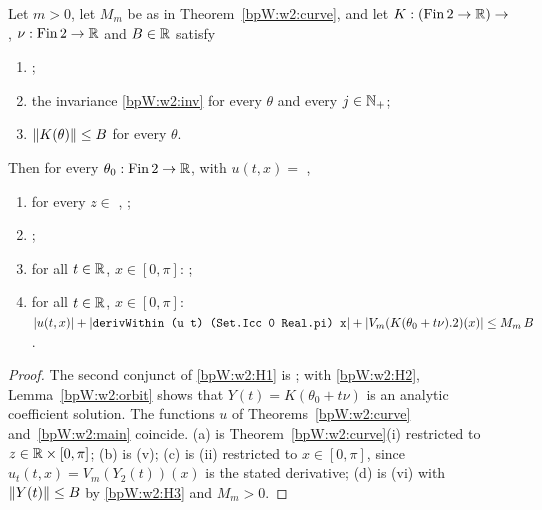 \begin{theorem}\label{bpW:w2:main}
Let $m>0$, let $M_m$ be as in Theorem~\ref{bpW:w2:curve}, and let $K:(\mathrm{Fin}\,2\to\mathbb{R})\to$ ,
$\nu:\mathrm{Fin}\,2\to\mathbb{R}$ and $B\in\mathbb{R}$ satisfy
\begin{enumerate}[label=(H\arabic*)]
\item\label{bpW:w2:H1} ;
\item\label{bpW:w2:H2} the invariance \eqref{bpW:w2:inv} for every $\theta$ and every $j\in\mathbb{N}_+$;
\item\label{bpW:w2:H3} $\lVert K(\theta)\rVert\le B$ for every $\theta$.
\end{enumerate}
Then for every $\theta_0:\mathrm{Fin}\,2\to\mathbb{R}$, with $u(t,x)=$ ,
\begin{enumerate}[label=(\alph*)]
\item for every $z\in$ ,
  ;
\item {};
\item for all $t\in\mathbb{R}$, $x\in[0,\pi]$: ;
\item for all $t\in\mathbb{R}$, $x\in[0,\pi]$:
  $\lvert u(t,x)\rvert+\lvert \texttt{derivWithin (u t) (Set.Icc 0 Real.pi) x}\rvert+\lvert V_m(K(\theta_0+t\nu).2)(x)\rvert\le M_m\,B$.
\end{enumerate}
\end{theorem}

\begin{proof}
\label{stepW:w2:mred}
The second conjunct of \ref{bpW:w2:H1} is ; with \ref{bpW:w2:H2},
Lemma~\ref{bpW:w2:orbit} shows that $Y(t)=K(\theta_0+t\nu)$ is an analytic coefficient solution. The functions $u$ of
Theorems~\ref{bpW:w2:curve} and~\ref{bpW:w2:main} coincide.
\label{stepW:w2:mconc}
(a) is Theorem~\ref{bpW:w2:curve}(i) restricted to $z\in\mathbb{R}\times[0,\pi]$; (b) is (v); (c) is (ii) restricted to
$x\in[0,\pi]$, since $u_t(t,x)=V_m(Y_2(t))(x)$ is the stated derivative; (d) is (vi) with $\lVert Y(t)\rVert\le B$ by
\ref{bpW:w2:H3} and $M_m>0$.
\end{proof}

